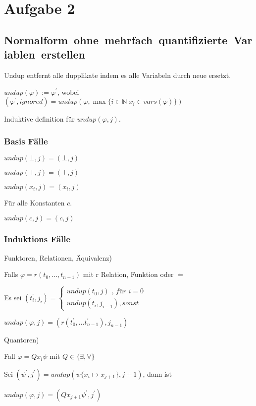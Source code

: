 \section*{Aufgabe 2}

\subsection*{\mbox{Normalform ohne mehrfach quantifizierte Variablen erstellen}}
Undup entfernt alle dupplikate indem es alle Variabeln durch neue ersetzt.

$undup(\varphi) := \varphi^\prime $, wobei $ (\varphi^\prime,ignored) = undup(\varphi,\max\limits{\{ i \in \mathbb{N} | x_i \in vars(\varphi)\}})$

\hfill

Induktive definition für $undup(\varphi,j)$.

\subsubsection*{Basis Fälle}

$undup(\bot,j) = (\bot , j)$

$undup(\top,j) = (\top, j)$

$undup(x_i,j) = 	(x_i, j)$

Für alle Konstanten $c$.

$undup(c,j) = (c,j)$

\subsubsection*{Induktions Fälle}


Funktoren, Relationen, Äquivalenz) 

\hfill

Falls $\varphi = r(t_0,...,t_{n-1})$ mit r Relation, Funktion oder $\dot=$ 

Es sei $(t^\prime_i,j_i) = \begin{cases}
	undup(t_0,j) \textit{ , für } i=0 \\
	undup(t_i,j_{i-1}) , sonst
\end{cases}$

$undup(\varphi,j) = (r(t^\prime_0,...t^\prime_{n-1}),j_{n-1})$

\hfill

Quantoren)

\hfill

Fall $\varphi = Q x_i \psi$ mit $Q \in \{\exists,\forall\}$

Sei $(\psi^\prime,j^\prime) = undup(\psi\{x_i \mapsto x_{j+1}\},j+1)$, dann ist

$undup(\varphi, j) = 	(Q x_{j+1} \psi^\prime , j^\prime)$